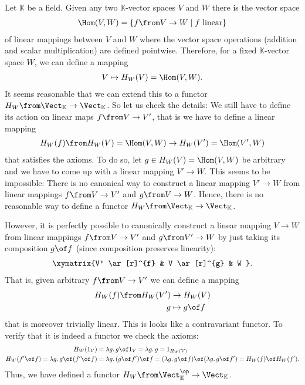 \documentclass{article}
\theoremstyle{definition}
\begin{document}
Let $\mathbb K$ be a field. Given any two $\mathbb K$-vector spaces $V$ and $W$ there is the vector space
\begin{align*}
  \Hom(V,W)=\{f\from V\to W\mid f \text{ linear}\}
\end{align*}
of linear mappings between $V$ and $W$ where the vector space operations (addition and scalar multiplication) are defined pointwise. Therefore, for a fixed $\mathbb K$-vector space $W$, we can define a mapping
\begin{align*}
  V\mapsto H_W(V)=\Hom(V,W).
\end{align*}
It seems reasonable that we can extend this to a functor $H_W\from\Vect_{\mathbb K}\to\Vect_{\mathbb K}$. So let us check the details: We still have to define its action on linear maps $f\from V\to V'$, that is we have to define a linear mapping
\begin{align*}
  H_W(f)\from H_W(V)=\Hom(V,W)\to H_W(V')=\Hom(V',W)
\end{align*}
 that satisfies the axioms. To do so, let $g\in H_W(V)=\Hom(V,W)$ be arbitrary and we have to come up with a linear mapping $V'\to W$. This seems to be impossible: There is no canonical way to construct a linear mapping $V'\to W$ from linear mappings $f\from V\to V'$ and $g\from V\to W$. Hence, there is no reasonable way to define a functor $H_W\from\Vect_{\mathbb K}\to\Vect_{\mathbb K}$.

However, it is perfectly possible to canonically construct a linear mapping $V\to W$ from linear mappings $f\from V\to V'$ and $g\from V'\to W$ by just taking its composition $g\of f$ (since composition preserves linearity):
\begin{align*}
  \xymatrix{V' \ar[r]^{f} & V \ar[r]^{g} & W }.
\end{align*}
That is, given arbitrary $f\from V\to V'$ we can define a mapping
\begin{align*}
  H_W(f)\from H_W(V')&\to H_W(V)\\
  g&\mapsto g\of f
\end{align*}
that is moreover trivially linear. This is looks like a contravariant functor. To verify that it is indeed a functor we check the axioms:
\begin{align*}
  H_W(1_V)&=\lambda g\ldotp g\of 1_V=\lambda g\ldotp g=1_{H_W(V)}\\
  H_W(f'\of f)=\lambda g\ldotp g\of (f'\of f)&=\lambda g\ldotp (g\of f')\of f=(\lambda g\ldotp g\of f)\of (\lambda g\ldotp g\of f')=H_W(f)\of H_W(f').
\end{align*}
Thus, we have defined a functor $H_W\from\Vect_{\mathbb K}^\op\to\Vect_{\mathbb K}$.
\end{document}
